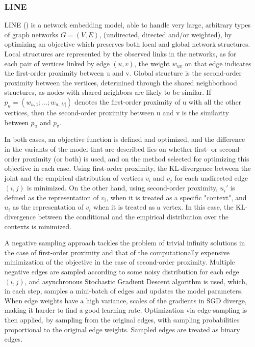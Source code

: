 \subsubsection{LINE}

LINE (\cite{DBLP:journals/corr/TangQWZYM15}) is a network embedding model, able to handle very large, arbitrary types of graph networks $G=(V,E)$, (undirected, directed and/or weighted), by optimizing an objective which preserves both local and global network structures. Local structures are represented by the observed links in the networks, as for each pair of vertices linked by edge $(u, v)$, the weight $w_{uv}$ on that edge indicates the first-order proximity between u and v. Global structure is the second-order proximity between the vertices, determined through the shared neighborhood structures, as nodes with shared neighbors are likely to be similar. If $p_u = (w_{u,1}; \dots ;w_{u,|V|})$ denotes the first-order proximity of u with all the other vertices, then the second-order proximity between u and v is the similarity between $p_u$ and $p_v$.

In both cases, an objective function is defined and optimized, and the difference in the variants of the model that are described lies on whether first- or second-order proximity (or both) is used, and on the method selected for optimizing this objective in each case. Using first-order proximity, the KL-divergence between the joint and the empirical distribution of vertices $v_i$ and $v_j$ for each undirected edge $(i,j)$ is minimized. On the other hand, using second-order proximity, $u_i'$ is defined as the representation of $v_i$, when it is treated as a specific "context", and $u_i$ as the representation of $v_i$ when it is treated as a vertex. In this case, the KL-divergence between the conditional and the empirical distribution over the contexts is minimized.

A negative sampling approach tackles the problem of trivial infinity solutions in the case of first-order proximity and that of the computationally expensive minimization of the objective in the case of second-order proximity. Multiple negative edges are sampled according to some noisy distribution for each edge $(i,j)$, and asynchronous Stochastic Gradient Descent algorithm is used, which, in each step, samples a mini-batch of edges and updates the model parameters.
When edge weights have a high variance, scales of the gradients in SGD diverge, making it harder to find a good learning rate. Optimization via edge-sampling is then applied, by sampling from the original edges, with sampling probabilities proportional to the original edge weights. Sampled edges are treated as binary edges.

